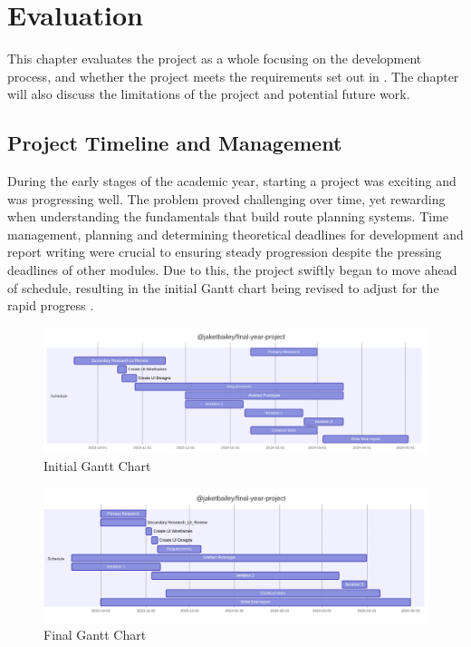 \chapter{Evaluation}
\label{chap:evaluation}

This chapter evaluates the project as a whole focusing on the development process, and whether the project meets the requirements set out in . The chapter will also discuss the limitations of the project and potential future work.

\section{Project Timeline and Management}
\label{evaluation:timeline-management}

During the early stages of the academic year, starting a project was exciting and was progressing well. The problem proved challenging over time, yet rewarding when understanding the fundamentals that build route planning systems. Time management, planning and determining theoretical deadlines for development and report writing were crucial to ensuring steady progression despite the pressing deadlines of other modules. Due to this, the project swiftly began to move ahead of schedule, resulting in the initial Gantt chart  being revised to adjust for the rapid progress .

\newpage
\begin{landscape}
\begin{figure}[ht!]
    \centering
    \includegraphics[width=1\linewidth]{figures/Old FYP Gantt - Timeline 1.pdf}
    \caption{Initial Gantt Chart}
    \label{fig:initial-gantt}
\end{figure}

\begin{figure}[h!]
    \centering
    \includegraphics[width=1\linewidth]{figures/Actual FYP Gantt.pdf}
    \caption{Final Gantt Chart}
    \label{fig:final-gantt}
\end{figure}
\newpage
\end{landscape}


